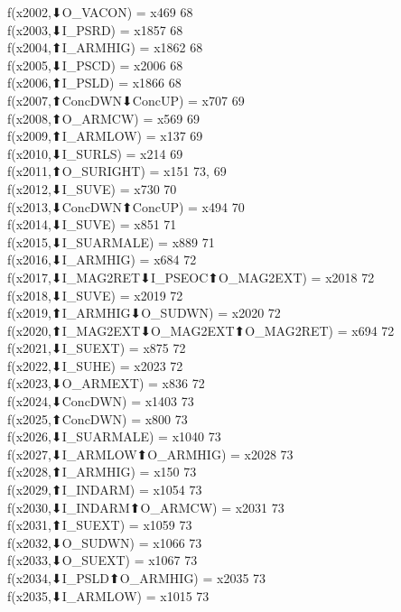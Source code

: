 f(x2002,⬇O_VACON) = x469 {68} \\
f(x2003,⬇I_PSRD) = x1857 {68} \\
f(x2004,⬆I_ARMHIG) = x1862 {68} \\
f(x2005,⬇I_PSCD) = x2006 {68} \\
f(x2006,⬆I_PSLD) = x1866 {68} \\
f(x2007,⬆ConcDWN⬇ConcUP) = x707 {69} \\
f(x2008,⬆O_ARMCW) = x569 {69} \\
f(x2009,⬆I_ARMLOW) = x137 {69} \\
f(x2010,⬇I_SURLS) = x214 {69} \\
f(x2011,⬆O_SURIGHT) = x151 {73, 69} \\
f(x2012,⬇I_SUVE) = x730 {70} \\
f(x2013,⬇ConcDWN⬆ConcUP) = x494 {70} \\
f(x2014,⬇I_SUVE) = x851 {71} \\
f(x2015,⬇I_SUARMALE) = x889 {71} \\
f(x2016,⬇I_ARMHIG) = x684 {72} \\
f(x2017,⬇I_MAG2RET⬇I_PSEOC⬆O_MAG2EXT) = x2018 {72} \\
f(x2018,⬇I_SUVE) = x2019 {72} \\
f(x2019,⬆I_ARMHIG⬇O_SUDWN) = x2020 {72} \\
f(x2020,⬆I_MAG2EXT⬇O_MAG2EXT⬆O_MAG2RET) = x694 {72} \\
f(x2021,⬇I_SUEXT) = x875 {72} \\
f(x2022,⬇I_SUHE) = x2023 {72} \\
f(x2023,⬇O_ARMEXT) = x836 {72} \\
f(x2024,⬇ConcDWN) = x1403 {73} \\
f(x2025,⬆ConcDWN) = x800 {73} \\
f(x2026,⬇I_SUARMALE) = x1040 {73} \\
f(x2027,⬇I_ARMLOW⬆O_ARMHIG) = x2028 {73} \\
f(x2028,⬆I_ARMHIG) = x150 {73} \\
f(x2029,⬆I_INDARM) = x1054 {73} \\
f(x2030,⬇I_INDARM⬆O_ARMCW) = x2031 {73} \\
f(x2031,⬆I_SUEXT) = x1059 {73} \\
f(x2032,⬇O_SUDWN) = x1066 {73} \\
f(x2033,⬇O_SUEXT) = x1067 {73} \\
f(x2034,⬇I_PSLD⬆O_ARMHIG) = x2035 {73} \\
f(x2035,⬇I_ARMLOW) = x1015 {73} \\

